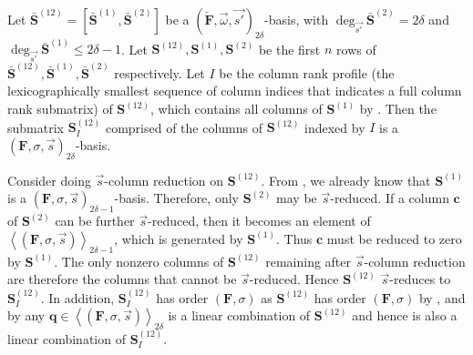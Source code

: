\begin{lem}
\label{lem:2deltaBasis}Let $\bar{\mathbf{S}}^{\left(12\right)}=[\bar{\mathbf{S}}^{\left(1\right)},\bar{\mathbf{S}}^{\left(2\right)}]$
be a $(\check{\mathbf{F}},\vec{\omega},\vec{s'})_{2\delta}$-basis,
with $\deg_{\vec{s'}}\bar{\mathbf{S}}^{\left(2\right)}=2\delta$ and
$\deg_{\vec{s'}}\bar{\mathbf{S}}^{\left(1\right)}\le2\delta-1$. Let
$\mathbf{S}^{\left(12\right)},\mathbf{S}^{\left(1\right)},\mathbf{S}^{\left(2\right)}$
be the first $n$ rows of $\bar{\mathbf{S}}^{\left(12\right)},\bar{\mathbf{S}}^{\left(1\right)},\bar{\mathbf{S}}^{\left(2\right)}$
respectively. Let $I$ be the column rank profile (the lexicographically
smallest sequence of column indices that indicates a full column rank
submatrix) of $\mathbf{S}^{\left(12\right)}$, which contains all
columns of $\mathbf{S}^{\left(1\right)}$ by .
Then the submatrix\textbf{ $\mathbf{S}_{I}^{\left(12\right)}$ }comprised
of the columns of $\mathbf{S}^{\left(12\right)}$ indexed by $I$
is a $\left(\mathbf{F},\sigma,\vec{s}\right)_{2\delta}$-basis. \end{lem}
\begin{pf}
Consider doing $\vec{s}$-column reduction on $\mathbf{S}^{\left(12\right)}$.
From , we already know that $\mathbf{S}^{\left(1\right)}$
is a $\left(\mathbf{F},\sigma,\vec{s}\right)_{2\delta-1}$-basis.
Therefore, only $\mathbf{S}^{\left(2\right)}$ may be $\vec{s}$-reduced.
If a column $\mathbf{c}$ of $\mathbf{S}^{\left(2\right)}$ can be
further $\vec{s}$-reduced, then it becomes an element of $\left\langle \left(\mathbf{F},\sigma,\vec{s}\right)\right\rangle _{2\delta-1}$,
which is generated by $\mathbf{S}^{\left(1\right)}$. Thus $\mathbf{c}$
must be reduced to zero by $\mathbf{S}^{\left(1\right)}$. The only
nonzero columns of $\mathbf{S}^{\left(12\right)}$ remaining after
$\vec{s}$-column reduction are therefore the columns that cannot
be $\vec{s}$-reduced. Hence $\mathbf{S}^{\left(12\right)}$ $\vec{s}$-reduces
to \textbf{$\mathbf{S}_{I}^{\left(12\right)}$}. In addition, \textbf{$\mathbf{S}_{I}^{\left(12\right)}$}
has order $\left(\mathbf{F},\sigma\right)$ as $\mathbf{S}^{\left(12\right)}$
has order $\left(\mathbf{F},\sigma\right)$ by ,
and by  any $\mathbf{q}\in\left\langle \left(\mathbf{F},\sigma,\vec{s}\right)\right\rangle _{2\delta}$
is a linear combination of $\mathbf{S}^{\left(12\right)}$ and hence
is also a linear combination of $\mathbf{S}_{I}^{\left(12\right)}$. 
\end{pf}
